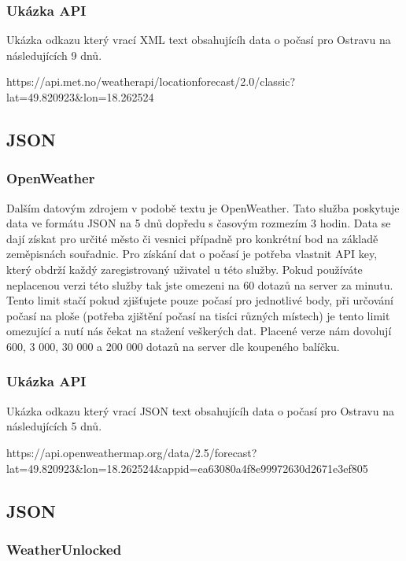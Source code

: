 \documentclass[czech,bachelor,dept460,male,csharp,cpdeclaration]{diploma}
\begin{document}
	\subsubsection{Ukázka API}
	
	Ukázka odkazu který vrací XML text obsahujícíh data o počasí pro Ostravu na následujících 9 dnů.
	
	https://api.met.no/weatherapi/locationforecast/2.0/classic?lat=49.820923\&lon=18.262524
	
	\subsection{JSON}
	\subsubsection{OpenWeather}
	
	Dalším datovým zdrojem v podobě textu je OpenWeather. Tato služba poskytuje data ve formátu JSON na 5 dnů dopředu s časovým rozmezím 3 hodin. Data se dají získat pro určité město či vesnici případně pro konkrétní bod na základě zeměpisnách souřadnic. Pro získání dat o počasí je potřeba vlastnit API key, který obdrží každý zaregistrovaný uživatel u této služby. Pokud používáte neplacenou verzi této služby tak jste omezeni na 60 dotazů na server za minutu. Tento limit stačí pokud zjišťujete pouze počasí pro jednotlivé body, při určování počasí na ploše (potřeba zjištění počasí na tisíci různých místech) je tento limit omezující a nutí nás čekat na stažení veškerých dat. Placené verze nám dovolují 600, 3 000, 30 000 a 200 000 dotazů na server dle koupeného balíčku.
	
	\subsubsection{Ukázka API}
	
	Ukázka odkazu který vrací JSON text obsahujícíh data o počasí pro Ostravu na následujících 5 dnů.
	
	https://api.openweathermap.org/data/2.5/forecast?lat=49.820923\&lon=18.262524\&appid=ea63080a4f8e99972630d2671e3ef805
	
	\subsection{JSON}
	\subsubsection{WeatherUnlocked}
	
\end{document}
